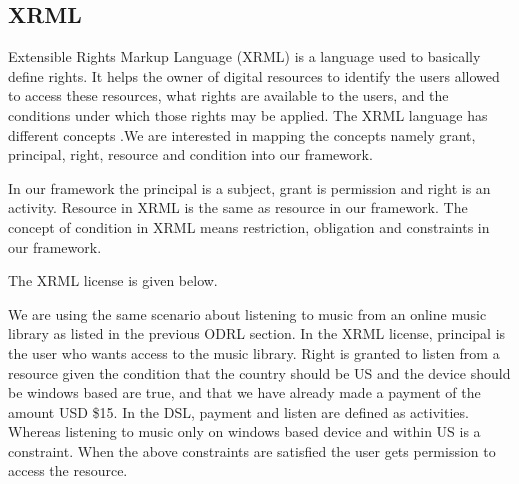 \subsection{XRML}\label{sec:model-xrml}

Extensible Rights Markup Language (XRML) is a language used to basically define rights. It helps the owner of digital resources to identify the users allowed to access these resources, what rights are available to the users, and the conditions under which those rights may be applied. The XRML language has different concepts .We are interested in mapping the concepts namely grant, principal, right, resource and condition into our framework.

In our framework the principal is a subject, grant is permission and right is an activity. Resource in XRML is the same as resource in our framework. The concept of condition in XRML means restriction, obligation and constraints in our framework.


The XRML license is given below.



We are using the same scenario about listening to music from an online music library as listed in the previous ODRL section. In the XRML license, principal is the user who wants access to the music library. Right is granted to listen from a resource given the condition that the country should be US and the device should be windows based are true, and that we have already made a payment of the amount USD \$15. In the DSL, payment and listen are defined as activities. Whereas listening to music only on windows based device and within US is a constraint. When the above constraints are satisfied the user gets permission to access the resource. 